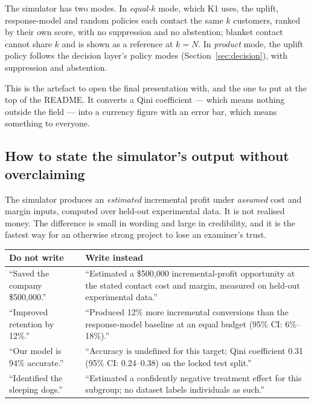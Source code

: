 \documentclass[11pt,a4paper]{article}
\begin{document}
The simulator has two modes. In \emph{equal-$k$} mode, which K1 uses, the uplift, response-model
and random policies each contact the same $k$ customers, ranked by their own score, with no
suppression and no abstention; blanket contact cannot share $k$ and is shown as a reference at
$k = N$. In \emph{product} mode, the uplift policy follows the decision layer's policy modes
(Section~\ref{sec:decision}), with suppression and abstention.

\begin{goodbox}
This is the artefact to open the final presentation with, and the one to put at the top of the
README. It converts a Qini coefficient --- which means nothing outside the field --- into a
currency figure with an error bar, which means something to everyone.
\end{goodbox}

\subsection{How to state the simulator's output without overclaiming}
\label{sec:honest-claims}

\begin{alertbox}
The simulator produces an \emph{estimated} incremental profit under \emph{assumed} cost and margin
inputs, computed over held-out experimental data. It is not realised money. The difference is small
in wording and large in credibility, and it is the fastest way for an otherwise strong project to
lose an examiner's trust.
\end{alertbox}

\begin{tabularx}{\textwidth}{@{}L{7.0cm}L{7.6cm}@{}}
\toprule
\textbf{Do not write} & \textbf{Write instead} \\
\midrule
``Saved the company \$500{,}000.'' & ``Estimated a \$500{,}000 incremental-profit opportunity at the
stated contact cost and margin, measured on held-out experimental data.'' \\
``Improved retention by 12\%.'' & ``Produced 12\% more incremental conversions than the response-model
baseline at an equal budget (95\% CI: 6\%--18\%).'' \\
``Our model is 94\% accurate.'' & ``Accuracy is undefined for this target; Qini coefficient 0.31
(95\% CI: 0.24--0.38) on the locked test split.'' \\
``Identified the sleeping dogs.'' & ``Estimated a confidently negative treatment effect for this
subgroup; no dataset labels individuals as such.'' \\
\bottomrule
\end{tabularx}
\end{document}
